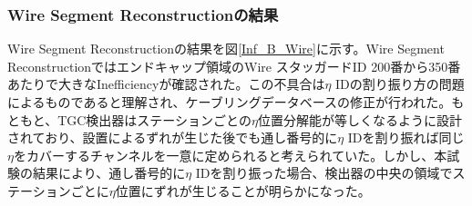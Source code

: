 
\subsubsection*{Wire Segment Reconstructionの結果}
Wire Segment Reconstructionの結果を図\ref{Inf_B_Wire}に示す。Wire Segment Reconstructionではエンドキャップ領域のWire スタッガードID 200番から350番あたりで大きなInefficiencyが確認された。この不具合は$\eta$ IDの割り振り方の問題によるものであると理解され、ケーブリングデータベースの修正が行われた。もともと、TGC検出器はステーションごとの$\eta$位置分解能が等しくなるように設計されており、設置によるずれが生じた後でも通し番号的に$\eta$ IDを割り振れば同じ$\eta$をカバーするチャンネルを一意に定められると考えられていた。しかし、本試験の結果により、通し番号的に$\eta$ IDを割り振った場合、検出器の中央の領域でステーションごとに$\eta$位置にずれが生じることが明らかになった。



